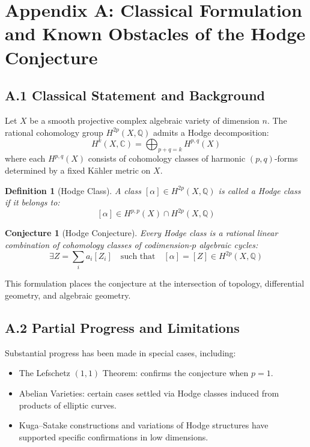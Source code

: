 \documentclass[11pt]{article}
\newtheorem{definition}[theorem]{Definition}
\newtheorem{conjecture}{Conjecture}[section]
\begin{document}
\appendix
\section*{Appendix A: Classical Formulation and Known Obstacles of the Hodge Conjecture}


\subsection*{A.1 Classical Statement and Background}

Let $X$ be a smooth projective complex algebraic variety of dimension $n$.  
The rational cohomology group $H^{2p}(X, \mathbb{Q})$ admits a Hodge decomposition:
\[
H^k(X, \mathbb{C}) = \bigoplus_{p+q=k} H^{p,q}(X)
\]
where each $H^{p,q}(X)$ consists of cohomology classes of harmonic $(p,q)$-forms determined by a fixed Kähler metric on $X$.

\begin{definition}[Hodge Class]
A class $[\alpha] \in H^{2p}(X, \mathbb{Q})$ is called a \emph{Hodge class} if it belongs to:
\[
[\alpha] \in H^{p,p}(X) \cap H^{2p}(X, \mathbb{Q})
\]
\end{definition}

\begin{conjecture}[Hodge Conjecture]
Every Hodge class is a rational linear combination of cohomology classes of codimension-$p$ algebraic cycles:
\[
\exists Z = \sum_i a_i [Z_i] \quad \text{such that} \quad [\alpha] = [Z] \in H^{2p}(X, \mathbb{Q})
\]
\end{conjecture}

This formulation places the conjecture at the intersection of topology, differential geometry, and algebraic geometry.

\subsection*{A.2 Partial Progress and Limitations}

Substantial progress has been made in special cases, including:

\begin{itemize}
  \item The Lefschetz $(1,1)$ Theorem: confirms the conjecture when $p=1$.
  \item Abelian Varieties: certain cases settled via Hodge classes induced from products of elliptic curves.
  \item Kuga–Satake constructions and variations of Hodge structures have supported specific confirmations in low dimensions.
\end{itemize}
\end{document}

